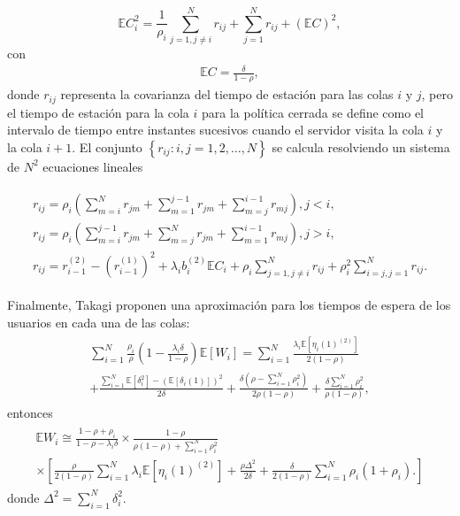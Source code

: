 \documentclass{article}
\newcommand{\esp}{\mathbb{E}}
\numberwithin{equation}{section}
\begin{document}
\begin{equation}\label{Eq.Periodo.Intervisita.Gated}
\esp C_{i}^{2}=\frac{1}{\rho_{i}}\sum_{j=1,j\neq
i}^{N}r_{ij}+\sum_{j=1}^{N}r_{ij}+\left(\esp C\right)^{2},
\end{equation}
con
\begin{eqnarray*}
\esp C=\frac{\delta}{1-\rho},
\end{eqnarray*}
donde $r_{ij}$ representa la covarianza del tiempo de estaci\'on para las colas $i$ y $j$, pero el tiempo de estaci\'on para la cola $i$ para la pol\'itica cerrada se define como el intervalo de tiempo entre instantes sucesivos cuando el servidor visita la cola $i$ y la cola $i+1$. El conjunto $\left\{r_{ij}:i,j=1,2,\ldots,N\right\}$ se calcula resolviendo un
sistema de $N^{2}$ ecuaciones lineales

\begin{eqnarray}\label{Eq.Cov.TT.Gated}
\begin{array}{l}
r_{ij}=\rho_{i}\left(\sum_{m=i}^{N}r_{jm}+\sum_{m=1}^{j-1}r_{jm}+\sum_{m=j}^{i-1}r_{mj}\right),\textrm{
}j<i,\\
r_{ij}=\rho_{i}\left(\sum_{m=i}^{j-1}r_{jm}+\sum_{m=j}^{N}r_{jm}+\sum_{m=1}^{i-1}r_{mj}\right),\textrm{
}j>i,\\
r_{ij}=r_{i-1}^{(2)}-\left(r_{i-1}^{(1)}\right)^{2}+\lambda_{i}b_{i}^{(2)}\esp
C_{i}+\rho_{i}\sum_{j=1,j\neq
i}^{N}r_{ij}+\rho_{i}^{2}\sum_{i=j,j=1}^{N}r_{ij}.
\end{array}
\end{eqnarray}

Finalmente, Takagi \cite{Takagi} proponen una aproximaci\'on para los tiempos de espera de los usuarios en cada una de las colas:
\begin{eqnarray}
\begin{array}{l}
\sum_{i=1}^{N}\frac{\rho_{i}}{\rho}\left(1-\frac{\lambda_{i}\delta}{1-\rho}\right)\esp\left[W_{i}\right]=\sum_{i=1}^{N}\frac{\lambda_{i}\esp\left[\eta_{i}\left(1\right)^{(2)}\right]}{2\left(1-\rho\right)}\\
+\frac{\sum_{i=1}^{N}\esp\left[\delta_{i}^{2}\right]-\left(\esp\left[\delta_{i}\left(1\right)\right]\right)^{2}}{2\delta}+\frac{\delta\left(\rho-\sum_{i=1}^{N}\rho_{i}^{2}\right)}{2\rho\left(1-\rho\right)}+\frac{\delta\sum_{i=1}^{N}\rho_{i}^{2}}{\rho\left(1-\rho\right)},
\end{array}
\end{eqnarray}
entonces
\begin{eqnarray}\label{LPCPKL}
\begin{array}{l}
\esp
W_{i}\cong\frac{1-\rho+\rho_{i}}{1-\rho-\lambda_{i}\delta}\times\frac{1-\rho}{\rho\left(1-\rho\right)+\sum_{i=1}^{N}\rho_{i}^{2}}\\
\times\left[\frac{\rho}{2\left(1-\rho\right)}\sum_{i=1}^{N}\lambda_{i}\esp\left[\eta_{i}\left(1\right)^{(2)}\right]+\frac{\rho\Delta^{2}}{2\delta}+\frac{\delta}{2\left(1-\rho\right)}\sum_{i=1}^{N}\rho_{i}\left(1+\rho_{i}\right).\right]
\end{array}
\end{eqnarray}
donde $\Delta^{2}=\sum_{i=1}^{N}\delta_{i}^{2}$. 
\end{document}
